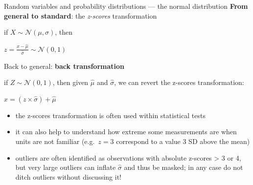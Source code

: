 \documentclass[
  ignorenonframetext,
  aspectratio=169,
  t]{beamer}
\providecommand{\tightlist}{%
  \setlength{\itemsep}{0pt}\setlength{\parskip}{0pt}}
\newcommand{\bluenorm}[1]{\textcolor{bluebeamer}{#1}}
\newcommand{\blueit}[1]{\textcolor{bluebeamer}{\emph{#1}}}
\newcommand{\bluebold}[1]{\textcolor{bluebeamer}{\textbf{#1}}}
\begin{document}
\begin{frame}{Random variables and probability distributions --- the
normal distribution}
\protect{}\label{random-variables-and-probability-distributions-the-normal-distribution-1}
\bluebold{From general to standard}: the \blueit{z-scores}
transformation

if \(X \sim \mathcal{N}(\mu, \sigma)\), then

\(z = \frac{x-\hat{\mu}}{\hat{\sigma}} \sim \mathcal{N}(0, 1)\)

\pause

Back to general: \bluebold{back transformation}

if \(Z \sim \mathcal{N}(0, 1)\), then given \(\hat{\mu}\) and
\(\hat{\sigma}\), we can revert the z-scores transformation:

\(x = (z \times \hat{\sigma}) + \hat{\mu}\)

\pause

\begin{itemize}
\tightlist
\item
  the z-scores transformation is often used within statistical tests
\item
  it can also help to understand how extreme some measurements are when
  units are not familiar (e.g.~\(z = 3\) correspond to a value 3 SD
  above the mean)
\item
  outliers are often identified as observations with absolute z-scores
  \textgreater{} 3 or 4, but very large outliers can inflate
  \(\hat{\sigma}\) and thus be masked; in any case
  \bluenorm{do not ditch outliers without discussing it!}
\end{itemize}
\end{frame}
\end{document}
